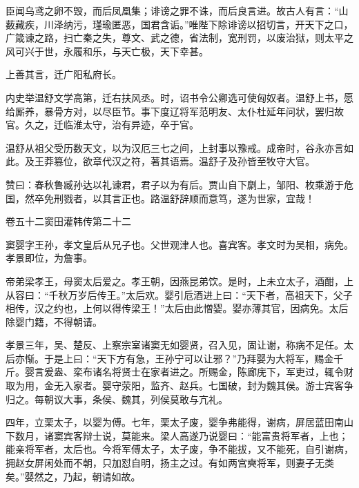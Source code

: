 \documentclass[12pt,UTF8]{ctexbook}
\begin{document}
臣闻乌鸢之卵不毁，而后凤凰集；诽谤之罪不诛，而后良言进。故古人有言：“山薮藏疾，川泽纳污，瑾瑜匿恶，国君含诟。”唯陛下除诽谤以招切言，开天下之口，广箴谏之路，扫亡秦之失，尊文、武之德，省法制，宽刑罚，以废治狱，则太平之风可兴于世，永履和乐，与天亡极，天下幸甚。



上善其言，迁广阳私府长。



内史举温舒文学高第，迁右扶风丞。时，诏书令公卿选可使匈奴者。温舒上书，愿给厮养，暴骨方对，以尽臣节。事下度辽将军范明友、太仆杜延年问状，罢归故官。久之，迁临淮太守，治有异迹，卒于官。



温舒从祖父受历数天文，以为汉厄三七之间，上封事以豫戒。成帝时，谷永亦言如此。及王莽篡位，欲章代汉之符，著其语焉。温舒子及孙皆至牧守大官。



赞曰：春秋鲁臧孙达以礼谏君，君子以为有后。贾山自下劘上，邹阳、枚乘游于危国，然卒免刑戮者，以其言正也。路温舒辞顺而意笃，遂为世家，宜哉！





卷五十二窦田灌韩传第二十二



窦婴字王孙，孝文皇后从兄子也。父世观津人也。喜宾客。孝文时为吴相，病免。孝景即位，为詹事。



帝弟梁孝王，母窦太后爱之。孝王朝，因燕昆弟饮。是时，上未立太子，酒酣，上从容曰：“千秋万岁后传王。”太后欢。婴引卮酒进上曰：“天下者，高祖天下，父子相传，汉之约也，上何以得传梁王！”太后由此憎婴。婴亦薄其官，因病免。太后除婴门籍，不得朝请。



孝景三年，吴、楚反、上察宗室诸窦无如婴贤，召入见，固让谢，称病不足任。太后亦惭。于是上曰：“天下方有急，王孙宁可以让邪？”乃拜婴为大将军，赐金千斤。婴言爰盎、栾布诸名将贤士在家者进之。所赐金，陈廊庑下，军吏过，辄令财取为用，金无入家者。婴守荥阳，监齐、赵兵。七国破，封为魏其侯。游士宾客争归之。每朝议大事，条侯、魏其，列侯莫敢与亢礼。



四年，立栗太子，以婴为傅。七年，栗太子废，婴争弗能得，谢病，屏居蓝田南山下数月，诸窦宾客辩士说，莫能来。梁人高遂乃说婴曰：“能富贵将军者，上也；能亲将军者，太后也。今将军傅太子，太子废，争不能拔，又不能死，自引谢病，拥赵女屏闲处而不朝，只加怼自明，扬主之过。有如两宫奭将军，则妻子无类矣。”婴然之，乃起，朝请如故。
\end{document}

